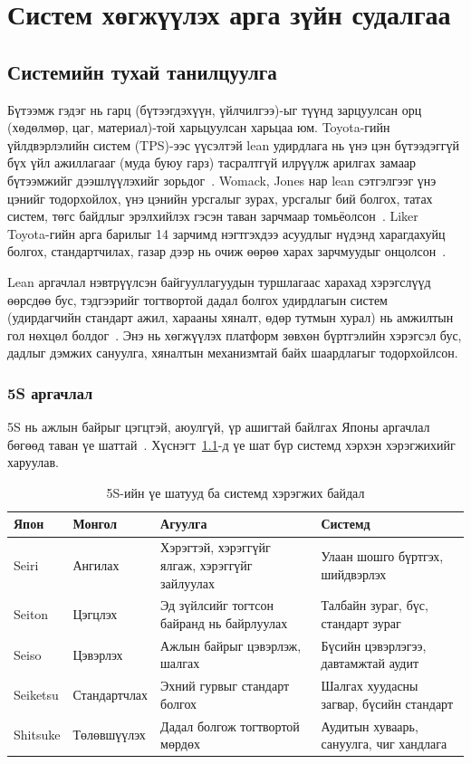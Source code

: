 
\chapter{Систем хөгжүүлэх арга зүйн судалгаа}
\label{Chapter1}

\section{Системийн тухай танилцуулга}
Бүтээмж гэдэг нь гарц (бүтээгдэхүүн, үйлчилгээ)-ыг түүнд зарцуулсан орц (хөдөлмөр, цаг, материал)-той харьцуулсан харьцаа юм. Toyota-гийн үйлдвэрлэлийн систем (TPS)-ээс үүсэлтэй lean удирдлага нь үнэ цэн бүтээдэггүй бүх үйл ажиллагааг (муда буюу гарз) тасралтгүй илрүүлж арилгах замаар бүтээмжийг дээшлүүлэхийг зорьдог~\cite{ohno,womack}. Womack, Jones нар lean сэтгэлгээг үнэ цэнийг тодорхойлох, үнэ цэнийн урсгалыг зурах, урсгалыг бий болгох, татах систем, төгс байдлыг эрэлхийлэх гэсэн таван зарчмаар томьёолсон~\cite{womack}. Liker Toyota-гийн арга барилыг 14 зарчимд нэгтгэхдээ асуудлыг нүдэнд харагдахуйц болгох, стандартчилах, газар дээр нь очиж өөрөө харах зарчмуудыг онцолсон~\cite{liker}.

Lean аргачлал нэвтрүүлсэн байгууллагуудын туршлагаас харахад хэрэгслүүд өөрсдөө бус, тэдгээрийг тогтвортой дадал болгох удирдлагын систем (удирдагчийн стандарт ажил, харааны хяналт, өдөр тутмын хурал) нь амжилтын гол нөхцөл болдог~\cite{mann}. Энэ нь хөгжүүлэх платформ зөвхөн бүртгэлийн хэрэгсэл бус, дадлыг дэмжих сануулга, хяналтын механизмтай байх шаардлагыг тодорхойлсон.

\subsection{5S аргачлал}
5S нь ажлын байрыг цэгцтэй, аюулгүй, үр ашигтай байлгах Японы аргачлал бөгөөд таван үе шаттай~\cite{hirano,osada}. Хүснэгт~\ref{table:fives}-д үе шат бүр системд хэрхэн хэрэгжихийг харуулав.

\begin{table}[H]
\centering
\caption{5S-ийн үе шатууд ба системд хэрэгжих байдал}
\label{table:fives}
\begin{tabular}{|l|l|p{4.6cm}|p{4.6cm}|}
\hline
\textbf{Япон} & \textbf{Монгол} & \textbf{Агуулга} & \textbf{Системд} \\ \hline
Seiri & Ангилах & Хэрэгтэй, хэрэггүйг ялгаж, хэрэггүйг зайлуулах & Улаан шошго бүртгэх, шийдвэрлэх \\ \hline
Seiton & Цэгцлэх & Эд зүйлсийг тогтсон байранд нь байрлуулах & Талбайн зураг, бүс, стандарт зураг \\ \hline
Seiso & Цэвэрлэх & Ажлын байрыг цэвэрлэж, шалгах & Бүсийн цэвэрлэгээ, давтамжтай аудит \\ \hline
Seiketsu & Стандартчлах & Эхний гурвыг стандарт болгох & Шалгах хуудасны загвар, бүсийн стандарт \\ \hline
Shitsuke & Төлөвшүүлэх & Дадал болгож тогтвортой мөрдөх & Аудитын хуваарь, сануулга, чиг хандлага \\ \hline
\end{tabular}
\end{table}

